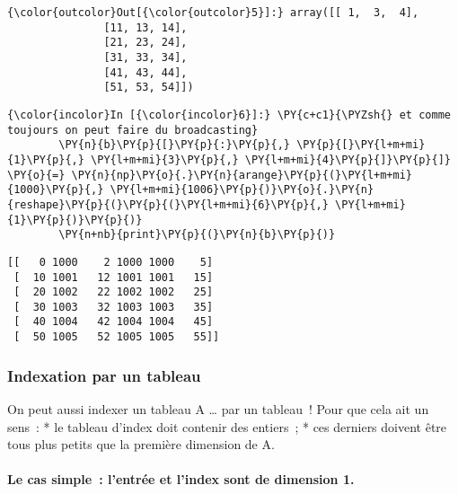 \begin{Verbatim}[commandchars=\\\{\}]
{\color{outcolor}Out[{\color{outcolor}5}]:} array([[ 1,  3,  4],
               [11, 13, 14],
               [21, 23, 24],
               [31, 33, 34],
               [41, 43, 44],
               [51, 53, 54]])
\end{Verbatim}
            
    \begin{Verbatim}[commandchars=\\\{\}]
{\color{incolor}In [{\color{incolor}6}]:} \PY{c+c1}{\PYZsh{} et comme toujours on peut faire du broadcasting}
        \PY{n}{b}\PY{p}{[}\PY{p}{:}\PY{p}{,} \PY{p}{[}\PY{l+m+mi}{1}\PY{p}{,} \PY{l+m+mi}{3}\PY{p}{,} \PY{l+m+mi}{4}\PY{p}{]}\PY{p}{]} \PY{o}{=} \PY{n}{np}\PY{o}{.}\PY{n}{arange}\PY{p}{(}\PY{l+m+mi}{1000}\PY{p}{,} \PY{l+m+mi}{1006}\PY{p}{)}\PY{o}{.}\PY{n}{reshape}\PY{p}{(}\PY{p}{(}\PY{l+m+mi}{6}\PY{p}{,} \PY{l+m+mi}{1}\PY{p}{)}\PY{p}{)}
        \PY{n+nb}{print}\PY{p}{(}\PY{n}{b}\PY{p}{)}
\end{Verbatim}


    \begin{Verbatim}[commandchars=\\\{\}]
[[   0 1000    2 1000 1000    5]
 [  10 1001   12 1001 1001   15]
 [  20 1002   22 1002 1002   25]
 [  30 1003   32 1003 1003   35]
 [  40 1004   42 1004 1004   45]
 [  50 1005   52 1005 1005   55]]

    \end{Verbatim}

    \hypertarget{indexation-par-un-tableau}{%
\subsubsection{Indexation par un
tableau}\label{indexation-par-un-tableau}}

    On peut aussi indexer un tableau A \ldots{} par un tableau~! Pour que
cela ait un sens~: * le tableau d'index doit contenir des entiers~; *
ces derniers doivent être tous plus petits que la première dimension de
A.

    \hypertarget{le-cas-simple-lentruxe9e-et-lindex-sont-de-dimension-1.}{%
\paragraph{Le cas simple~: l'entrée et l'index sont de dimension
1.}\label{le-cas-simple-lentruxe9e-et-lindex-sont-de-dimension-1.}}

